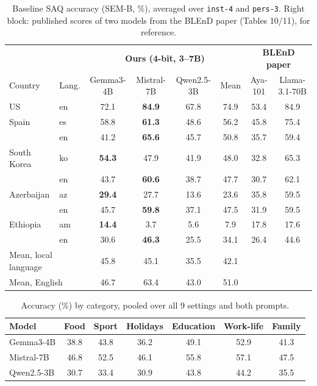 \documentclass[11pt]{article}
\begin{document}
\begin{table}[h]
\centering
\caption{Baseline SAQ accuracy (SEM-B, \%), averaged over \texttt{inst-4} and \texttt{pers-3}.
Right block: published scores of two models from the BLEnD paper (Tables 10/11), for reference.}
\label{tab:main}
\begin{tabular}{ll|ccc|c||cc}
\toprule
 & & \multicolumn{4}{c||}{\textbf{Ours (4-bit, 3--7B)}} & \multicolumn{2}{c}{\textbf{BLEnD paper}} \\
Country & Lang. & Gemma3-4B & Mistral-7B & Qwen2.5-3B & Mean & Aya-101 & Llama-3.1-70B \\
\midrule
US          & en & 72.1 & \textbf{84.9} & 67.8 & 74.9 & 53.4 & 84.9 \\
\midrule
Spain       & es & 58.8 & \textbf{61.3} & 48.6 & 56.2 & 45.8 & 75.4 \\
            & en & 41.2 & \textbf{65.6} & 45.7 & 50.8 & 35.7 & 59.4 \\
\midrule
South Korea & ko & \textbf{54.3} & 47.9 & 41.9 & 48.0 & 32.8 & 65.3 \\
            & en & 43.7 & \textbf{60.6} & 38.7 & 47.7 & 30.7 & 62.1 \\
\midrule
Azerbaijan  & az & \textbf{29.4} & 27.7 & 13.6 & 23.6 & 35.8 & 59.5 \\
            & en & 45.7 & \textbf{59.8} & 37.1 & 47.5 & 31.9 & 59.5 \\
\midrule
Ethiopia    & am & \textbf{14.4} & 3.7 & 5.6 & 7.9 & 17.8 & 17.6 \\
            & en & 30.6 & \textbf{46.3} & 25.5 & 34.1 & 26.4 & 44.6 \\
\midrule
\multicolumn{2}{l|}{Mean, local language} & 45.8 & 45.1 & 35.5 & 42.1 & & \\
\multicolumn{2}{l|}{Mean, English}        & 46.7 & 63.4 & 43.0 & 51.0 & & \\
\bottomrule
\end{tabular}
\end{table}

\begin{table}[h]
\centering
\caption{Accuracy (\%) by category, pooled over all 9 settings and both prompts.}
\label{tab:catres}
\begin{tabular}{lcccccc}
\toprule
Model & Food & Sport & Holidays & Education & Work-life & Family \\
\midrule
Gemma3-4B  & 38.8 & 43.8 & 36.2 & 49.1 & 52.9 & 41.3 \\
Mistral-7B & 46.8 & 52.5 & 46.1 & 55.8 & 57.1 & 47.5 \\
Qwen2.5-3B & 30.7 & 33.4 & 30.9 & 43.8 & 44.2 & 35.5 \\
\bottomrule
\end{tabular}
\end{table}
\end{document}
